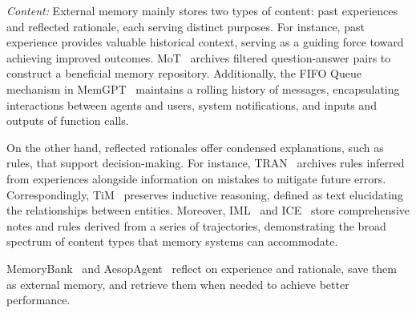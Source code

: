\documentclass[sn-basic, Numbered]{sn-jnl}%
\theoremstyle{thmstyleone}%
\theoremstyle{thmstyletwo}%
\theoremstyle{thmstylethree}%
\begin{document}
\textit{Content:} External memory mainly stores two types of content: past experiences and reflected rationale, each serving distinct purposes. For instance, past experience provides valuable historical context, serving as a guiding force toward achieving improved outcomes.
MoT~\cite{li2023mot} archives filtered question-answer pairs to construct a beneficial memory repository. 
Additionally, the FIFO Queue mechanism in MemGPT~\cite{packer2023memgpt} maintains a rolling history of messages, encapsulating interactions between agents and users, system notifications, and inputs and outputs of function calls.

On the other hand, reflected rationales offer condensed explanations, such as rules, that support decision-making. For instance, 
TRAN~\cite{yang2023failures} archives rules inferred from experiences alongside information on mistakes to mitigate future errors.
Correspondingly, TiM~\cite{liu2023think} preserves inductive reasoning, defined as text elucidating the relationships between entities.
Moreover, IML~\cite{wang2024memory} and ICE~\cite{qian2024investigate} store comprehensive notes and rules derived from a series of trajectories, demonstrating the broad spectrum of content types that memory systems can accommodate.

MemoryBank~\cite{zhong2024memorybank} and AesopAgent~\cite{wang2024aesopagent} reflect on experience and rationale, save them as external memory, and retrieve them when needed to achieve better performance.
\end{document}
